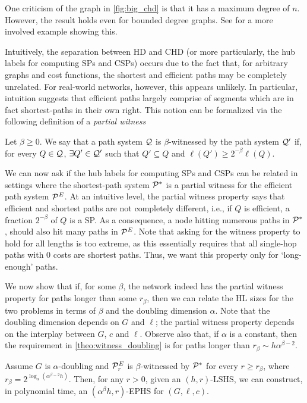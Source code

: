 \begin{remark}
	One criticism of the graph in \cref{fig:big_chd} is that it has a maximum degree of $n$.
	However, the result holds even for bounded degree graphs.
	See \cite{TechReport} for a more involved example showing this.
\end{remark}

Intuitively, the separation between HD and CHD (or more particularly, the hub labels for computing SPs and CSPs) occurs due to the fact that, for arbitrary graphs and cost functions, the shortest and efficient paths may be completely unrelated. 
For real-world networks, however, this appears unlikely.
In particular, intuition suggests that efficient paths largely comprise of segments which are in fact shortest-paths in their own right. 
This notion can be formalized via the following definition of a \emph{partial witness} 
\begin{definition}
	Let $\beta\geq 0$.
	We say that a path system $\mathcal{Q}$ is $\beta$-witnessed by the path system $\mathcal{Q}'$ if, for every $Q\in\mathcal{Q}$, $\exists Q'\in\mathcal{Q}'$ such that $Q'\subseteq Q$ and $\ell(Q')\geq 2^{-\beta}\ell(Q)$.
\end{definition}
We can now ask if the hub labels for computing SPs and CSPs can be related in settings where the shortest-path system $\mathcal{P}^*$ is a partial witness for the efficient path system $\mathcal{P}^E$.
At an intuitive level, the partial witness property says that efficient and shortest paths are not completely different, i.e., if $Q$ is efficient, a fraction $2^{-\beta}$ of $Q$ is a SP.
As a consequence, a node hitting numerous paths in $\mathcal{P}^*$, should also hit many paths in $\mathcal{P}^E$.
Note that asking for the witness property to hold for all lengths is too extreme, as this essentially requires that all single-hop paths with 0 costs are shortest paths.
Thus, we want this property only for `long-enough' paths. 

We now show that if, for some $\beta$, the network indeed has the partial witness property for paths longer than some $r_\beta$, then we can relate the HL sizes for the two problems in terms of $\beta$ and the doubling dimension $\alpha$. 
Note that the doubling dimension depends on $G$ and $\ell$; the partial witness property depends on the interplay between $G$, $c$ and $\ell$.
Observe also that, if $\alpha$ is a constant, then the requirement in \cref{theo:witness_doubling} is for paths longer than $r_\beta\sim h\alpha^{\beta-2}$.
\begin{theorem}\label{theo:witness_doubling}
	Assume $G$ is $\alpha$-doubling and $\mathcal{P}^E_r$ is $\beta$-witnessed by $\mathcal{P}^*$ for every $r\geq r_\beta$, where $r_\beta=2^{\log_\alpha(\alpha^{\beta-2} h)}$. 
	Then, for any $r>0$, given an $(h,r)$-LSHS, we can construct, in polynomial time, an $(\alpha^{\beta} h,r)$-EPHS for $(G,\ell,c)$. 
\end{theorem}

